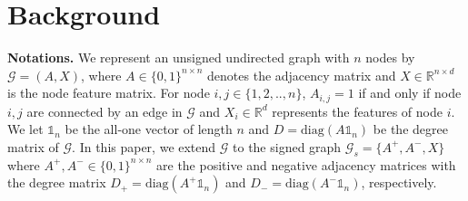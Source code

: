\section{Background}
\textbf{Notations.} 
We represent an unsigned undirected graph with \(n\) nodes by $\mathcal{G} = (A, X)$,
where $A \in \{0,1\}^{n \times n}$ denotes the adjacency matrix and \(X \in \mathbb{R}^{n \times d} \) is the node feature matrix. 
For node \(i,j \in \{1,2,..,n\}\), $A_{i,j} = 1$ if and only if node \(i, j\) are connected by an edge in \(\mathcal{G}\) and \(X_i \in \mathbb{R}^d\) represents the features of node \(i\).
We let $\mathbb{1}_n$ be the all-one vector of length $n$ and \(D = \text{diag}(A \mathbb{1}_n) \) be the degree matrix of \(\mathcal{G}\).
In this paper, we extend \(\mathcal{G}\) to the signed graph \(\mathcal{G}_s=\{A^+, A^-, X\}\) where \( A^+, A^- \in \{0,1\}^{n \times n} \) are the positive and negative adjacency matrices with the degree matrix \(D_+= \text{diag}(A^+ \mathbb{1}_n)\) and \(D_-= \text{diag}(A^- \mathbb{1}_n)\), respectively. 
% 


